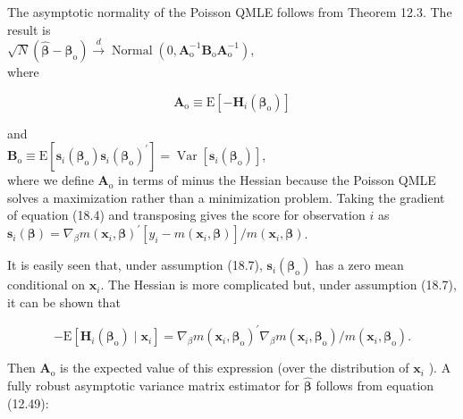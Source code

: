 \documentclass[10pt]{article}
\begin{document}
The asymptotic normality of the Poisson QMLE follows from Theorem 12.3. The result is\\
$\sqrt{N}\left(\hat{\boldsymbol{\beta}}-\boldsymbol{\beta}_{\mathrm{o}}\right) \xrightarrow{d} \operatorname{Normal}\left(0, \mathbf{A}_{\mathrm{o}}^{-1} \mathbf{B}_{\mathrm{o}} \mathbf{A}_{\mathrm{o}}^{-1}\right)$,\\
where


\begin{equation*}
\mathbf{A}_{\mathrm{o}} \equiv \mathrm{E}\left[-\mathbf{H}_{i}\left(\boldsymbol{\beta}_{\mathrm{o}}\right)\right] \tag{18.10}
\end{equation*}


and\\
$\mathbf{B}_{\mathrm{o}} \equiv \mathrm{E}\left[\mathbf{s}_{i}\left(\boldsymbol{\beta}_{\mathrm{o}}\right) \mathbf{s}_{i}\left(\boldsymbol{\beta}_{\mathrm{o}}\right)^{\prime}\right]=\operatorname{Var}\left[\mathbf{s}_{i}\left(\boldsymbol{\beta}_{\mathrm{o}}\right)\right]$,\\
where we define $\mathbf{A}_{\mathrm{o}}$ in terms of minus the Hessian because the Poisson QMLE solves a maximization rather than a minimization problem. Taking the gradient of equation (18.4) and transposing gives the score for observation $i$ as\\
$\mathbf{s}_{i}(\boldsymbol{\beta})=\nabla_{\beta} m\left(\mathbf{x}_{i}, \boldsymbol{\beta}\right)^{\prime}\left[y_{i}-m\left(\mathbf{x}_{i}, \boldsymbol{\beta}\right)\right] / m\left(\mathbf{x}_{i}, \boldsymbol{\beta}\right)$.

It is easily seen that, under assumption (18.7), $\mathbf{s}_{i}\left(\boldsymbol{\beta}_{\mathrm{o}}\right)$ has a zero mean conditional on $\mathbf{x}_{i}$. The Hessian is more complicated but, under assumption (18.7), it can be shown that


\begin{equation*}
-\mathrm{E}\left[\mathbf{H}_{i}\left(\boldsymbol{\beta}_{\mathrm{o}}\right) \mid \mathbf{x}_{i}\right]=\nabla_{\beta} m\left(\mathbf{x}_{i}, \boldsymbol{\beta}_{\mathrm{o}}\right)^{\prime} \nabla_{\beta} m\left(\mathbf{x}_{i}, \boldsymbol{\beta}_{\mathrm{o}}\right) / m\left(\mathbf{x}_{i}, \boldsymbol{\beta}_{\mathrm{o}}\right) . \tag{18.13}
\end{equation*}


Then $\mathbf{A}_{\mathrm{o}}$ is the expected value of this expression (over the distribution of $\mathbf{x}_{i}$ ). A fully robust asymptotic variance matrix estimator for $\hat{\boldsymbol{\beta}}$ follows from equation (12.49):
\end{document}
